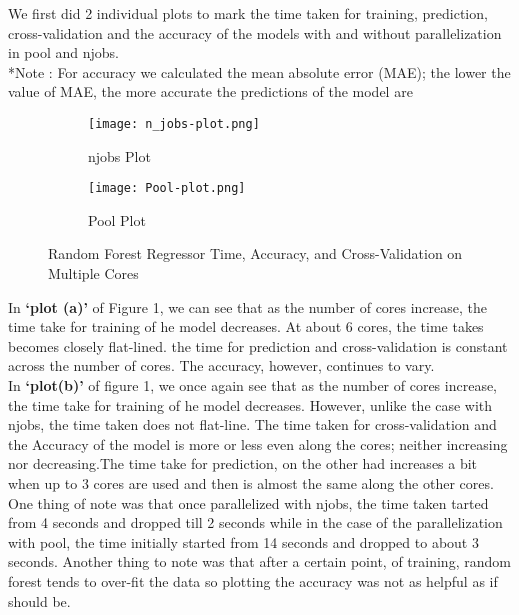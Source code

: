 \documentclass{article}
\begin{document}
We first did 2 individual plots to mark the time taken for training, prediction, cross-validation and the accuracy of the models with and without parallelization in pool and n\textunderscore{}jobs. \\

*Note : For accuracy we calculated the mean absolute error (MAE); the lower the value of MAE, the more accurate the predictions of the model are \\

\begin{figure}[H]
\begin{subfigure}{0.6\textwidth}
\hspace{-0.75cm}
\texttt{[image: n\_jobs-plot.png]} 
\caption{n\textunderscore{}jobs Plot}
\label{fig:subim1}
\end{subfigure}%
\begin{subfigure}{0.6\textwidth}
\hspace{-0.75cm}
\texttt{[image: Pool-plot.png]}
\caption{Pool Plot}
\label{fig:subim2}
\end{subfigure}

\caption{Random Forest Regressor Time, Accuracy, and Cross-Validation on Multiple Cores}
\label{fig:image1}
\end{figure}



In \textbf{`plot (a)'} of Figure 1, we can see that as the number of cores increase, the time take for training of he model decreases. At about 6 cores, the time takes becomes closely flat-lined. the time for prediction and cross-validation is constant across the number of cores. The accuracy, however, continues to vary. \\

In \textbf{`plot(b)'} of figure 1, we once again see that as the number of cores increase, the time take for training of he model decreases. However, unlike the case with n\textunderscore{}jobs, the time taken does not flat-line. The time taken for cross-validation and the Accuracy of the model is more or less even along the cores; neither increasing nor decreasing.The time take for prediction, on the other had increases a bit when up to 3 cores are used and then is almost the same along the other cores.\\

One thing of note was that once parallelized with n\textunderscore{}jobs, the time taken tarted from 4 seconds and dropped till 2 seconds while in the case of the parallelization with pool, the time initially started from 14 seconds and dropped to about 3 seconds. Another thing to note was that after a certain point, of training, random forest tends to over-fit the data so plotting the accuracy was not as helpful as if should be.
\end{document}
